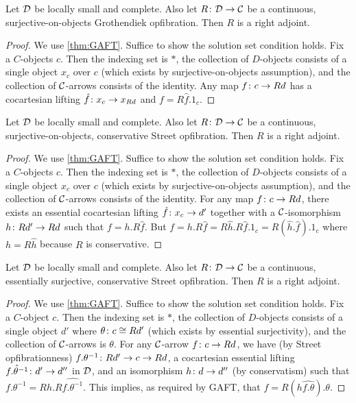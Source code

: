 \documentclass{amsart}
\begin{document}
\begin{thm}
	Let $ \mathcal{D}$ be locally small and complete. Also let $ R \colon \mathcal{D} \to \mathcal{C} $ be a continuous, surjective-on-objects Grothendiek opfibration.  Then $ R $ is a right adjoint.
\end{thm}

\begin{proof}
	We use \ref{thm:GAFT}.  Suffice to show the solution set condition holds.  Fix a $ C $-objects $ c $.  Then the indexing set is $ \ast $, the collection of $ D $-objects consists of a single object $ x_c $ over $ c $ (which exists by surjective-on-objects assumption), and the collection of $ \mathcal{C} $-arrows consists of the identity.  Any map $ f \colon c \to Rd $ has a cocartesian lifting $ \hat{f} \colon x_c \to x_{Rd} $ and $ f = R \hat{f} . 1_c $.
\end{proof}

\begin{thm}
	Let $ \mathcal{D}$ be locally small and complete. Also let $ R \colon \mathcal{D} \to \mathcal{C} $ be a continuous, surjective-on-objects, conservative Street opfibration.  Then $ R $ is a right adjoint.
\end{thm}

\begin{proof}
	We use \ref{thm:GAFT}.  Suffice to show the solution set condition holds.  Fix a $ C $-objects $ c $.  Then the indexing set is $ \ast $, the collection of $ D $-objects consists of a single object $ x_c $ over $ c $ (which exists by surjective-on-objects assumption), and the collection of $ \mathcal{C} $-arrows consists of the identity.  For any map $ f \colon c \to Rd $, there exists an essential cocartesian lifting $ \hat{f} \colon x_c \to d' $ together with a $ \mathcal{C} $-isomorphism $ h \colon Rd' \to Rd $ such that $ f = h . R \hat{f} $. But $ f = h . R \hat{f} = R \hat{h} . R \hat{f} . 1_c = R (\hat{h} . \hat{f}) . 1_c $ where $ h = R \hat{h} $ because $ R $ is conservative.
\end{proof}

\begin{thm}
	Let $ \mathcal{D}$ be locally small and complete. Also let $ R \colon \mathcal{D} \to \mathcal{C} $ be a continuous, essentially surjective, conservative Street opfibration.  Then $ R $ is a right adjoint.
\end{thm}

\begin{proof}
	We use \ref{thm:GAFT}.  Suffice to show the solution set condition holds.  Fix a $ C $-object $ c $.  Then the indexing set is $ \ast $, the collection of $ D $-objects consists of a single object $ d' $ where $ \theta \colon c \cong Rd' $ (which exists by essential surjectivity), and the collection of $ \mathcal{C} $-arrows is $ { \theta } $.  For any $ \mathcal{C} $-arrow $ f \colon c \to Rd $, we have (by Street opfibrationness) $ f . \theta^{-1} \colon Rd' \to c \to Rd $, a cocartesian essential lifting $ \hat{ f . \theta^{-1} } \colon d' \to d'' $ in $ \mathcal{D} $, and an isomorphism $ h \colon d \to d'' $ (by conservatism) such that $ f . \theta^{-1} = Rh . R \hat{ f . \theta^{-1} } $.  This implies, as required by GAFT, that $ f = R (h\hat{ f . \theta }) . \theta $.
\end{proof}
\end{document}
